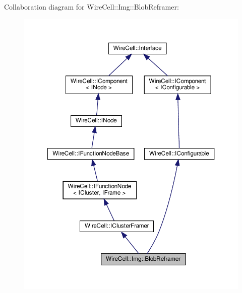 Collaboration diagram for Wire\+Cell\+:\+:Img\+:\+:Blob\+Reframer\+:
\nopagebreak
\begin{figure}[H]
\begin{center}
\leavevmode
\includegraphics[width=350pt]{class_wire_cell_1_1_img_1_1_blob_reframer__coll__graph}
\end{center}
\end{figure}
